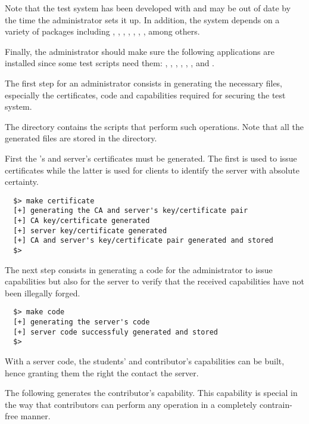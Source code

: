 Note that the test system has been developed with  and
may be out of date by the time the administrator sets it up. In addition,
the system depends on a variety of  packages including
, , , , ,
, ,  among others.

Finally, the administrator should make sure the following applications
are installed since some test scripts need them: , ,
, , , , 
and .


The first step for an administrator consists in generating the necessary
files, especially the certificates, code and capabilities required for
securing the test system.

The  directory contains the scripts that perform
such operations. Note that all the generated files are stored in the
 directory.

First the 's and server's certificates
must be generated. The first is used to issue certificates while the latter
is used for clients to identify the server with absolute certainty.

\begin{verbatim}
  $> make certificate
  [+] generating the CA and server's key/certificate pair
  [+] CA key/certificate generated
  [+] server key/certificate generated
  [+] CA and server's key/certificate pair generated and stored
  $> 
\end{verbatim}

The next step consists in generating a code for the administrator to
issue capabilities but also for the server to verify that the received
capabilities have not been illegally forged.

\begin{verbatim}
  $> make code
  [+] generating the server's code
  [+] server code successfuly generated and stored
  $> 
\end{verbatim}

With a server code, the students' and contributor's capabilities can be
built, hence granting them the right the contact the server.

The following generates the contributor's capability. This capability is
special in the way that contributors can perform any operation in a completely
contrain-free manner.

